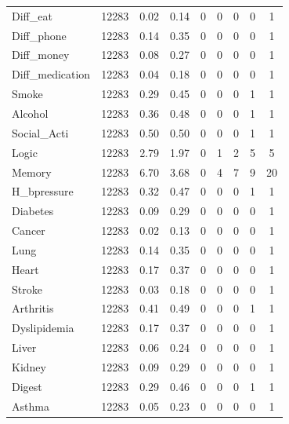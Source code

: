 \documentclass[12pt]{article}
\begin{document}
\begin{table}[htbp]
{\begin{tabular}{lcccccccc}
    Diff\_eat & 12283  & 0.02  & 0.14  & 0     & 0     & 0     & 0     & 1  \\
    Diff\_phone & 12283  & 0.14  & 0.35  & 0     & 0     & 0     & 0     & 1  \\
    Diff\_money & 12283  & 0.08  & 0.27  & 0     & 0     & 0     & 0     & 1  \\
    Diff\_medication & 12283  & 0.04  & 0.18  & 0     & 0     & 0     & 0     & 1  \\
    Smoke & 12283  & 0.29  & 0.45  & 0     & 0     & 0     & 1     & 1  \\
    Alcohol & 12283  & 0.36  & 0.48  & 0     & 0     & 0     & 1     & 1  \\
    Social\_Acti & 12283  & 0.50  & 0.50  & 0     & 0     & 0     & 1     & 1  \\
    Logic & 12283  & 2.79  & 1.97  & 0     & 1     & 2     & 5     & 5  \\
    Memory & 12283  & 6.70  & 3.68  & 0     & 4     & 7     & 9     & 20  \\
    H\_bpressure & 12283  & 0.32  & 0.47  & 0     & 0     & 0     & 1     & 1  \\
    Diabetes & 12283  & 0.09  & 0.29  & 0     & 0     & 0     & 0     & 1  \\
    Cancer & 12283  & 0.02  & 0.13  & 0     & 0     & 0     & 0     & 1  \\
    Lung  & 12283  & 0.14  & 0.35  & 0     & 0     & 0     & 0     & 1  \\
    Heart & 12283  & 0.17  & 0.37  & 0     & 0     & 0     & 0     & 1  \\
    Stroke & 12283  & 0.03  & 0.18  & 0     & 0     & 0     & 0     & 1  \\
    Arthritis & 12283  & 0.41  & 0.49  & 0     & 0     & 0     & 1     & 1  \\
    Dyslipidemia & 12283  & 0.17  & 0.37  & 0     & 0     & 0     & 0     & 1  \\
    Liver & 12283  & 0.06  & 0.24  & 0     & 0     & 0     & 0     & 1  \\
    Kidney & 12283  & 0.09  & 0.29  & 0     & 0     & 0     & 0     & 1  \\
    Digest & 12283  & 0.29  & 0.46  & 0     & 0     & 0     & 1     & 1  \\
    Asthma & 12283  & 0.05  & 0.23  & 0     & 0     & 0     & 0     & 1  \\
    \bottomrule
    \end{tabular}}
\end{table}%
\end{document}
